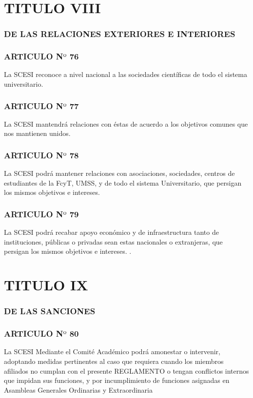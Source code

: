 \documentclass[letterpaper,11pt]{book}
\begin{document}
\section*{TITULO VIII}
\subsubsection*{DE LAS RELACIONES EXTERIORES E INTERIORES}
\subsubsection*{ARTICULO N$º$ 76}
La SCESI reconoce a nivel nacional a las sociedades científicas de todo el sistema universitario. 
\subsubsection*{ARTICULO N$º$ 77}
La SCESI mantendrá relaciones con éstas de acuerdo a los objetivos comunes que nos mantienen unidos. 
\subsubsection*{ARTICULO N$º$ 78}
La SCESI podrá mantener relaciones con asociaciones, sociedades, centros de estudiantes de la FcyT, UMSS, y de todo el sistema Universitario, que persigan los mismos objetivos e intereses. 
\subsubsection*{ARTICULO N$º$ 79}
La SCESI podrá recabar apoyo económico y de infraestructura tanto de instituciones, públicas o privadas sean estas nacionales o extranjeras, que persigan los mismos objetivos e intereses. . 
\section*{TITULO IX}
\subsubsection*{DE LAS SANCIONES}
\subsubsection*{ARTICULO N$º$ 80} 
La SCESI Mediante el Comité Académico podrá amonestar o intervenir, adoptando medidas pertinentes al caso que requiera cuando los miembros afiliados no cumplan con el presente REGLAMENTO o tengan conflictos internos que impidan sus funciones, y por incumplimiento de funciones asignadas en Asambleas Generales Ordinarias y Extraordinaria 
\end{document}
